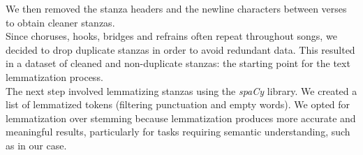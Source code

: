We then removed the stanza headers and the newline characters between verses to obtain cleaner stanzas. \\ 
Since choruses, hooks, bridges and refrains often repeat throughout songs, we decided to drop duplicate stanzas in order to avoid redundant data.
This resulted in a dataset of cleaned and non-duplicate stanzas: the starting point for the text lemmatization process.
\\
The next step involved lemmatizing stanzas using the \textit{spaCy} library. We created a list of lemmatized tokens (filtering punctuation and empty words). 
We opted for lemmatization over stemming because lemmatization produces more accurate and meaningful results, particularly for tasks requiring semantic understanding, such as in our case.








